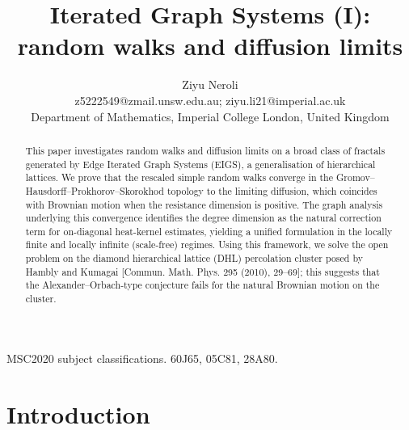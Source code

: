\documentclass{article}
\theoremstyle{plain}
\theoremstyle{definition}
\begin{document}
\title{Iterated Graph Systems (I): random walks and diffusion limits}

\author{Ziyu Neroli \\
\small{z5222549@zmail.unsw.edu.au; ziyu.li21@imperial.ac.uk} \\
\small{Department of Mathematics, Imperial College London, United Kingdom}
}
\date{}


\maketitle

\begin{abstract}
This paper investigates random walks and diffusion limits on a broad class of fractals generated by Edge Iterated Graph Systems (EIGS), a generalisation of hierarchical lattices.
We prove that the rescaled simple random walks converge in the Gromov--Hausdorff--Prokhorov--Skorokhod topology to the limiting diffusion, which coincides with Brownian motion when the resistance dimension is positive.
The graph analysis underlying this convergence identifies the degree dimension as the natural correction term for on-diagonal heat-kernel estimates, yielding a unified formulation in the locally finite and locally infinite (scale-free) regimes.
Using this framework, we solve the open problem on the diamond hierarchical lattice (DHL) percolation cluster posed by Hambly and Kumagai [Commun. Math. Phys. 295 (2010), 29--69]; this suggests that the Alexander--Orbach-type conjecture fails for the natural Brownian motion on the cluster.

\end{abstract}







MSC2020 subject classifications. 60J65, 05C81, 28A80.


\tableofcontents


\section{Introduction}\label{sec:intro}
\end{document}
